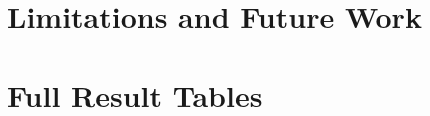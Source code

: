 \documentclass[11pt]{article}
\begin{document}
\section{Limitations and Future Work}\label{sec:limitations}

\appendix
\section{Full Result Tables}
\end{document}
